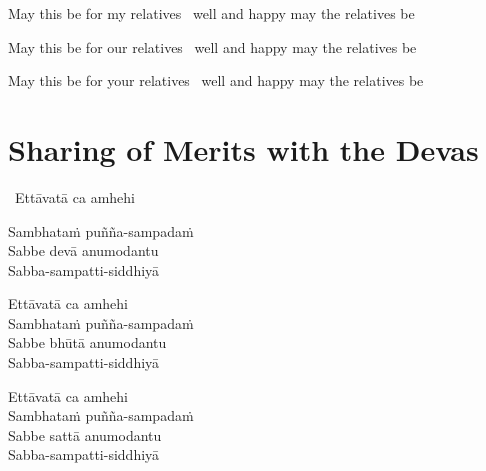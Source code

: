 \begin{english-verses}
  \begin{english-hang-first-line}
  May this be for my relatives \breathmark\ well and happy may the relatives be\\
  \end{english-hang-first-line}
  \begin{english-hang-together}
  May this be for our relatives \breathmark\ well and happy may the relatives be\\
  \end{english-hang-together}
  \begin{english-hang-together}
  May this be for your relatives \breathmark\ well and happy may the relatives be
  \end{english-hang-together}
\end{english-verses}

\suttaRef{[Pv 422]}

\ifdigitalversion{}\fi



\section{Sharing of Merits with the Devas}
\label{sharing-merits-devas}

\begin{leader-only}
  \anglebracketleft\ \hspace{-0.5mm}Ettāvatā ca amhehi \hspace{-0.5mm}\anglebracketright\
\end{leader-only}

\vspace{-0.99em}

Sambhataṁ puñña-sampadaṁ\\
Sabbe devā anumodantu\\
Sabba-sampatti-siddhiyā

Ettāvatā ca amhehi\\
Sambhataṁ puñña-sampadaṁ\\
Sabbe bhūtā anumodantu\\
Sabba-sampatti-siddhiyā

Ettāvatā ca amhehi\\
Sambhataṁ puñña-sampadaṁ\\
Sabbe sattā anumodantu\\
Sabba-sampatti-siddhiyā

\ifdigitalversion{}\fi

